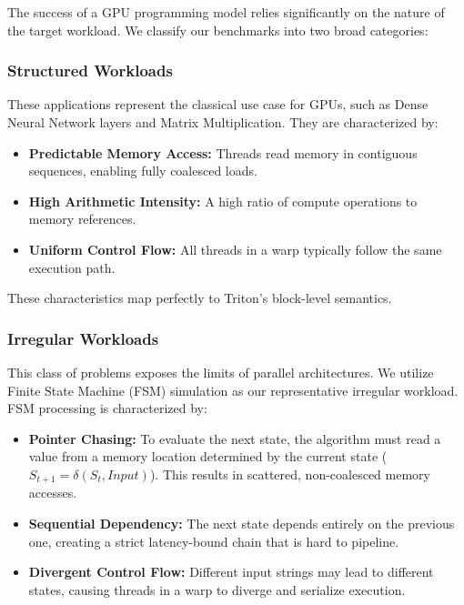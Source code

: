 The success of a GPU programming model relies significantly on the nature of the target workload. We classify our benchmarks into two broad categories:

\subsubsection{Structured Workloads}
These applications represent the classical use case for GPUs, such as Dense Neural Network layers and Matrix Multiplication. They are characterized by:
\begin{itemize}
    \item \textbf{Predictable Memory Access:} Threads read memory in contiguous sequences, enabling fully coalesced loads.
    \item \textbf{High Arithmetic Intensity:} A high ratio of compute operations to memory references.
    \item \textbf{Uniform Control Flow:} All threads in a warp typically follow the same execution path.
\end{itemize}
These characteristics map perfectly to Triton's block-level semantics.

\subsubsection{Irregular Workloads}
This class of problems exposes the limits of parallel architectures. We utilize Finite State Machine (FSM) simulation as our representative irregular workload. FSM processing is characterized by:
\begin{itemize}
    \item \textbf{Pointer Chasing:} To evaluate the next state, the algorithm must read a value from a memory location determined by the current state ($S_{t+1} = \delta(S_t, Input)$). This results in scattered, non-coalesced memory accesses.
    \item \textbf{Sequential Dependency:} The next state depends entirely on the previous one, creating a strict latency-bound chain that is hard to pipeline.
    \item \textbf{Divergent Control Flow:} Different input strings may lead to different states, causing threads in a warp to diverge and serialize execution.
\end{itemize}